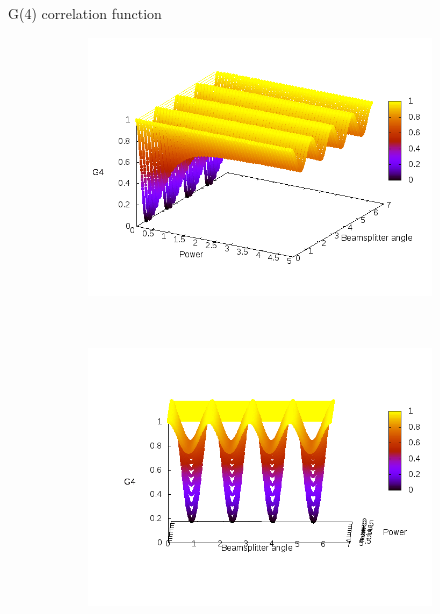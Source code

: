 \documentclass{beamer}
\begin{document}
\begin{frame}{G(4) correlation function}

    \begin{figure}
    \centering
        \begin{subfigure}{0.52\textwidth}
        \includegraphics[width=\textwidth]{g4plot1.png} 
        \end{subfigure}
        ~
        \begin{subfigure}{0.52\textwidth}
        \includegraphics[width=\textwidth]{g4plot3.png}
        \end{subfigure}

        \end{figure}


\end{frame}
\end{document}
